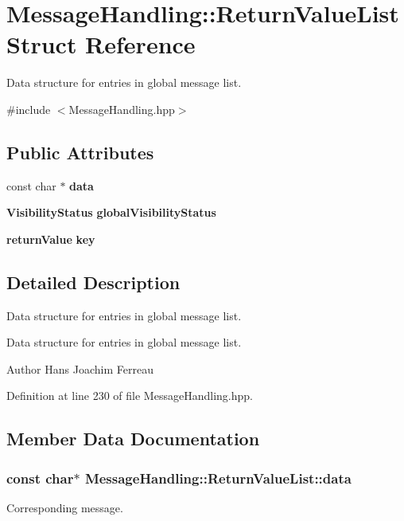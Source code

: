 \section{MessageHandling::ReturnValueList Struct Reference}
\label{structMessageHandling_1_1ReturnValueList}


Data structure for entries in global message list.  




{\ttfamily \#include $<$MessageHandling.hpp$>$}

\subsection*{Public Attributes}
\begin{DoxyCompactItemize}
\item 
const char $\ast$ {\bf data}
\item 
{\bf VisibilityStatus} {\bf globalVisibilityStatus}
\item 
{\bf returnValue} {\bf key}
\end{DoxyCompactItemize}


\subsection{Detailed Description}
Data structure for entries in global message list. 

Data structure for entries in global message list.

\begin{DoxyAuthor}{Author}
Hans Joachim Ferreau 
\end{DoxyAuthor}


Definition at line 230 of file MessageHandling.hpp.



\subsection{Member Data Documentation}
\subsubsection[{data}]{\setlength{\rightskip}{0pt plus 5cm}const char$\ast$ {\bf MessageHandling::ReturnValueList::data}}\label{structMessageHandling_1_1ReturnValueList_a5c222606c813d75a6cf46d68db507a60}
Corresponding message. 

